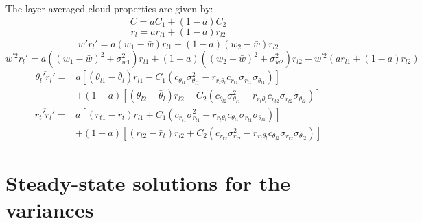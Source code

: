 \documentclass[11pt,fleqn]{article}
\begin{document}
The layer-averaged cloud properties are given by:
%
\begin{equation}
\overline{C} = a C_1 + (1-a) C_2
\end{equation}
%
\begin{equation}
\overline{r_l} = a r_{l1} + (1-a) r_{l2}
\end{equation}
%
\begin{equation}
\overline{w'r_l'} = a (w_1-\bar{w}) r_{l1} + (1-a) (w_2-\bar{w}) r_{l2}
\end{equation}
%
\begin{equation}
\overline{w^{'2}r_l'} 
= a \left( (w_1-\bar{w})^2 + \sigma_{w1}^2 \right) r_{l1} 
+ (1-a) \left( (w_2-\bar{w})^2 + \sigma_{w2}^2 \right) r_{l2}
- \overline{w^{'2}} \left( a r_{l1} + (1-a) r_{l2} \right)
\end{equation}
%
\begin{equation}
\begin{split}
\overline{\theta_l'r_l'}
=& a \left[ 
       (\theta_{l1} - \bar{\theta}_l ) r_{l1} 
       - C_1 
         \left( 
           c_{\theta_{l1}} \sigma_{\theta_{l1}}^2
           - r_{r_t \theta_l} c_{r_{t1}} \sigma_{r_{t1}} \sigma_{\theta_{l1}}
         \right)
     \right] \\
&+ (1-a) \left[ 
           (\theta_{l2} - \bar{\theta}_l ) r_{l2} 
           - C_2
             \left( 
               c_{\theta_{l2}} \sigma_{\theta_{l2}}^2
               - r_{r_t \theta_l} c_{r_{t2}} \sigma_{r_{t2}} \sigma_{\theta_{l2}}
             \right)
         \right]
\end{split}
\end{equation}
%
\begin{equation}
\begin{split}
\overline{r_t'r_l'}
=& a 
   \left[ 
     (r_{t1} - \bar{r}_t ) r_{l1} 
     + C_1
       \left(
         c_{r_{t1}} \sigma_{r_{t1}}^2
         - r_{r_t \theta_l} c_{\theta_{l1}} \sigma_{r_{t1}} \sigma_{\theta_{l1}}
       \right)
   \right]\\
&+ (1-a) 
   \left[ 
     (r_{t2} - \bar{r}_t ) r_{l2} 
     + C_2
       \left(
         c_{r_{t2}} \sigma_{r_{t2}}^2
         - r_{r_t \theta_l} c_{\theta_{l2}} \sigma_{r_{t2}} \sigma_{\theta_{l2}}
       \right)
   \right]
\end{split}
\end{equation}

\section{Steady-state solutions for the variances}
\end{document}

